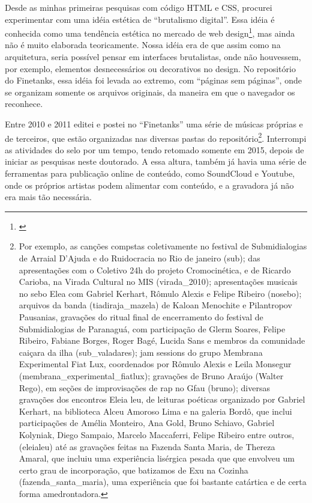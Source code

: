 Desde as minhas primeiras pesquisas com código HTML e CSS, procurei experimentar com uma idéia estética de ``brutalismo digital''. Essa idéia é conhecida como uma tendência estética no mercado de web design\footnote{\cite{Hill2017}}, mas ainda não é muito elaborada teoricamente. Nossa idéia era de que assim como na arquitetura, seria possível pensar em interfaces brutalistas, onde não houvessem, por exemplo, elementos desnecessários ou decorativos no design. No repositório do Finetanks, essa idéia foi levada ao extremo, com ``páginas sem páginas'', onde se organizam somente os arquivos originais, da maneira em que o navegador os reconhece.  


Entre 2010 e 2011 editei e postei no ``Finetanks'' uma série de músicas próprias e de terceiros, que estão organizadas nas diversas pastas do repositório\footnote{ Por exemplo, as canções compstas coletivamente no festival de Submidialogias de Arraial D'Ajuda e do Ruidocracia no Rio de janeiro (\/sub\/); das apresentações com o Coletivo 24h do projeto Cromocinética, e de Ricardo Carioba, na Virada Cultural no MIS (virada\_2010\/); apresentações musicais no sebo Elea com Gabriel Kerhart, Rômulo Alexis e Felipe Ribeiro (nosebo\/); arquivos da banda (tiadiraja\_mazela\/) de Kaloan Menochite e Pilantropov Pausanias, gravações do ritual final de encerramento do festival de Submidialogias de Paranaguá, com participação de Glerm Soares, Felipe Ribeiro, Fabiane Borges, Roger Bagé, Lucida Sans e membros da comunidade caiçara da ilha (\/sub\_valadares\/); jam sessions do grupo Membrana Experimental Fiat Lux, coordenados por Rômulo Alexis e Leila Monsegur (membrana\_experimental\_fiatlux\/); gravações de Bruno Araújo (Walter Rego), em seções de improvisações de rap no Gfau (bruno\/); diversas gravações dos encontros Eleia leu,  de leituras poéticas organizado por Gabriel Kerhart, na biblioteca Alceu Amoroso Lima e na galeria Bordô, que inclui participações de Amélia Monteiro, Ana Gold, Bruno Schiavo, Gabriel Kolyniak, Diego Sampaio, Marcelo Maccaferri, Felipe Ribeiro entre outros, (\/eleialeu\/) até as gravações feitas na Fazenda Santa Maria, de Thereza Amaral, que incluiu uma experiência lisérgica pesada que que envolveu um certo grau de incorporação, que batizamos de Exu na Cozinha (\/fazenda\_santa\_maria\/), uma experiência que foi bastante catártica e de certa forma amedrontadora. }. Interrompi as atividades do selo por um tempo, tendo retomado somente em 2015, depois de iniciar as pesquisas neste doutorado. A essa altura, também já havia uma série de ferramentas para publicação online de conteúdo, como SoundCloud e Youtube, onde os próprios artistas podem alimentar com conteúdo, e a gravadora já não era mais tão necessária.





